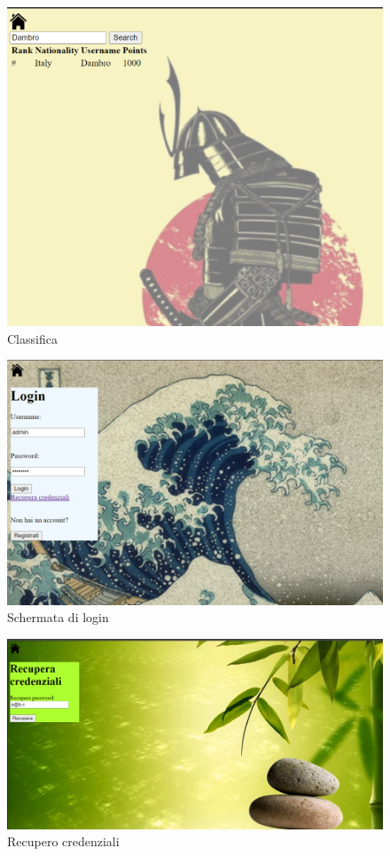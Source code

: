 \begin{figure}[!h]
\centering
\includegraphics[scale=0.70]{images/classificaFiltrata.png}
\caption{Classifica}
\label{fig:user_flow_guest}
\end{figure}
\noindent


\begin{figure}[!h]
\centering
\includegraphics[scale=0.70]{images/login.png}
\caption{Schermata di login}
\label{fig:user_flow_guest}
\end{figure}
\noindent


\begin{figure}[!h]
\centering
\includegraphics[scale=0.70]{images/recuperaCredenziali.png}
\caption{Recupero credenziali}
\label{fig:user_flow_guest}
\end{figure}
\noindent


